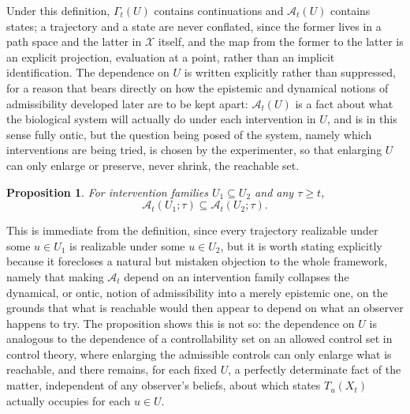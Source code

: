 \documentclass[11pt]{article}
\newtheorem{proposition}{Proposition}
\begin{document}
Under this definition, $\Gamma_t(U)$ contains continuations and $\mathcal{A}_t(U)$ contains states; a trajectory and a state are never conflated, since the former lives in a path space and the latter in $\mathcal{X}$ itself, and the map from the former to the latter is an explicit projection, evaluation at a point, rather than an implicit identification. The dependence on $U$ is written explicitly rather than suppressed, for a reason that bears directly on how the epistemic and dynamical notions of admissibility developed later are to be kept apart: $\mathcal{A}_t(U)$ is a fact about what the biological system will actually do under each intervention in $U$, and is in this sense fully ontic, but the question being posed of the system, namely which interventions are being tried, is chosen by the experimenter, so that enlarging $U$ can only enlarge or preserve, never shrink, the reachable set.

\begin{proposition}
For intervention families $U_1 \subseteq U_2$ and any $\tau \geq t$,
\begin{equation}
\mathcal{A}_t(U_1;\tau) \subseteq \mathcal{A}_t(U_2;\tau).
\end{equation}
\end{proposition}

This is immediate from the definition, since every trajectory realizable under some $u \in U_1$ is realizable under some $u \in U_2$, but it is worth stating explicitly because it forecloses a natural but mistaken objection to the whole framework, namely that making $\mathcal{A}_t$ depend on an intervention family collapses the dynamical, or ontic, notion of admissibility into a merely epistemic one, on the grounds that what is reachable would then appear to depend on what an observer happens to try. The proposition shows this is not so: the dependence on $U$ is analogous to the dependence of a controllability set on an allowed control set in control theory, where enlarging the admissible controls can only enlarge what is reachable, and there remains, for each fixed $U$, a perfectly determinate fact of the matter, independent of any observer's beliefs, about which states $T_u(X_t)$ actually occupies for each $u \in U$.
\end{document}
